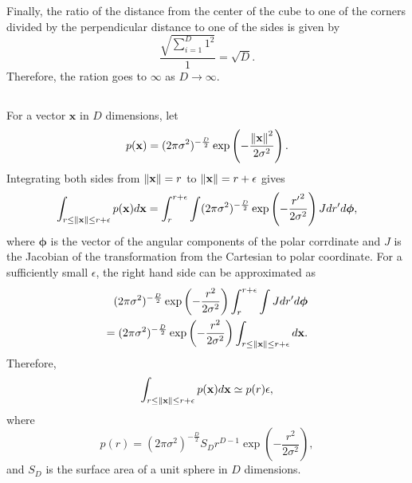 Finally, the ratio of the distance from the center of the cube to one of the corners divided by the perpendicular distance to one of the sides is given by
%
\begin{equation}
\frac{\sqrt{\sum_{i = 1}^{D} 1 ^ 2}}{1} = \sqrt{D}.
\end{equation}
%
Therefore, the ration goes to $\infty$ as $D \to \infty$.


\subsection{}
\label{1.20}
For a vector $\mathbf{x}$ in $D$ dimensions, let 
%
\begin{equation}
p(\mathbf{x}) = (2 \pi \sigma ^ 2) ^ {- \frac{D}{2}} \exp \left( - \frac{\norm{\mathbf{x}} ^ 2}{2 \sigma ^2} \right).
\end{equation}
%
Integrating both sides from $\norm{\mathbf{x}} = r$ to $\norm{\mathbf{x}} = r + \epsilon$ gives
%
\begin{equation}
\int_{r \leq \norm{\mathbf{x}} \leq r + \epsilon} p(\mathbf{x}) d\mathbf{x} = \int_{r}^{r + \epsilon} \int (2 \pi \sigma ^ 2) ^ {- \frac{D}{2}} \exp \left( - \frac{{r'} ^ 2}{2 \sigma ^2} \right) J dr' d\bm{\phi},
\end{equation}
%
where $\bm{\phi}$ is the vector of the angular components of the polar corrdinate and $J$ is the Jacobian of the transformation from the Cartesian to polar coordinate.
For a sufficiently small $\epsilon$, the right hand side can be approximated as
%
\begin{equation}
\begin{aligned}
(2 \pi \sigma ^ 2) ^ {- \frac{D}{2}} \exp \left( - \frac{r ^ 2}{2 \sigma ^2} \right) \int_{r}^{r + \epsilon} \int J dr' d\bm{\phi} \\
= (2 \pi \sigma ^ 2) ^ {- \frac{D}{2}} \exp \left( - \frac{r ^ 2}{2 \sigma ^2} \right) \int_{r \leq \norm{\mathbf{x}} \leq r + \epsilon} d\mathbf{x}.
\end{aligned}
\end{equation}
%
Therefore,
%
\begin{equation}
\int_{r \leq \norm{\mathbf{x}} \leq r + \epsilon} p(\mathbf{x}) d\mathbf{x} \simeq p(r) \epsilon,
\end{equation}
%
where
%
\begin{equation}
p(r) = (2 \pi \sigma ^ 2) ^ {- \frac{D}{2}} S_D r ^ {D - 1} \exp \left( - \frac{r ^ 2}{2 \sigma ^2} \right),
\end{equation}
%
and $S_D$ is the surface area of a unit sphere in $D$ dimensions.

